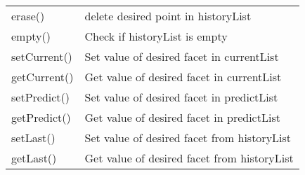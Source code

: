 \begin{center}
\begin{tabular}{|l|l|}
\rule{0pt}{3ex} erase()& delete desired point in historyList\\
\rule{0pt}{3ex} empty()& Check if historyList is empty\\
\rule{0pt}{3ex} setCurrent()& Set value of desired facet in currentList\\
\rule{0pt}{3ex} getCurrent()& Get value of desired facet in currentList\\
\rule{0pt}{3ex} setPredict()& Set value of desired facet in predictList\\
\rule{0pt}{3ex} getPredict()& Get value of desired facet in predictList\\
\rule{0pt}{3ex} setLast()& Set value of desired facet from historyList\\
\rule{0pt}{3ex} getLast()& Get value of desired facet from historyList\\
\hline
\end{tabular}
\end{center}


